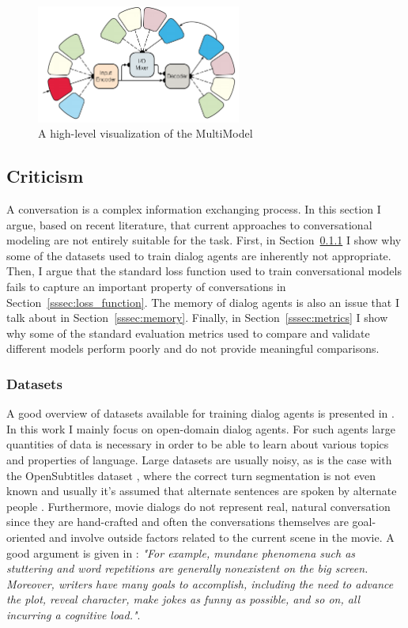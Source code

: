 \documentclass[12pt]{article}
\begin{document}
\begin{figure}[H]
	\centering
	\includegraphics[width=0.6\textwidth]{pics/multimodel.png}
	\caption{A high-level visualization of the MultiModel \cite{Kaiser_one_model:2017}}
	\label{fig:multimodel}
\end{figure}

\subsection{Criticism} \label{ssec:problems}
A conversation is a complex information exchanging process. In this section I argue, based on recent literature, that current approaches to conversational modeling are not entirely suitable for the task. First, in Section~\ref{sssec:datasets} I show why some of the datasets used to train dialog agents are inherently not appropriate. Then, I argue that the standard loss function used to train conversational models fails to capture an important property of conversations in Section~\ref{sssec:loss_function}. The memory of dialog agents is also an issue that I talk about in Section~\ref{sssec:memory}. Finally, in Section~\ref{sssec:metrics} I show why some of the standard evaluation metrics used to compare and validate different models perform poorly and do not provide meaningful comparisons.
	
\subsubsection{Datasets} \label{sssec:datasets}
A good overview of datasets available for training dialog agents is presented in \cite{Serban_survey:2015}. In this work I mainly focus on open-domain dialog agents. For such agents large quantities of data is necessary in order to be able to learn about various topics and properties of language. Large datasets are usually noisy, as is the case with the OpenSubtitles dataset \cite{OpenSubtitles:2016,opensubtitles}, where the correct turn segmentation is not even known and usually it's assumed that alternate sentences are spoken by alternate people \cite{Vinyals:2015}. Furthermore, movie dialogs do not represent real, natural conversation since they are hand-crafted and often the conversations themselves are goal-oriented and involve outside factors related to the current scene in the movie. A good argument is given in \cite{Danescu:2011}: \textit{"For example, mundane phenomena such as stuttering and word repetitions are generally nonexistent on the big screen. Moreover, writers have many goals to accomplish, including the need to advance the plot, reveal character, make jokes as funny as possible, and so on, all incurring a cognitive load."}.
\end{document}
